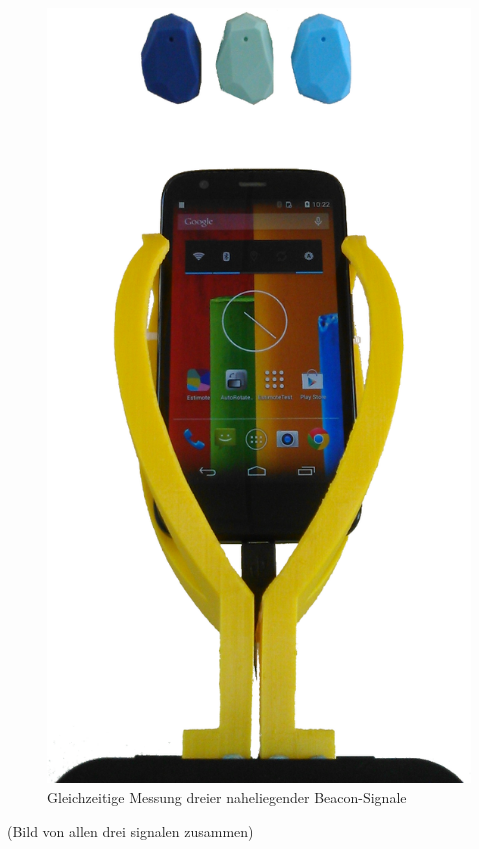\begin{figure}[H] 
\centering
\includegraphics[scale=0.2]{Bilder/MessungBeacon3}
\caption{Gleichzeitige Messung dreier naheliegender Beacon-Signale}
\label{fig:Dreier}
\end{figure}

(Bild von allen drei signalen zusammen)

